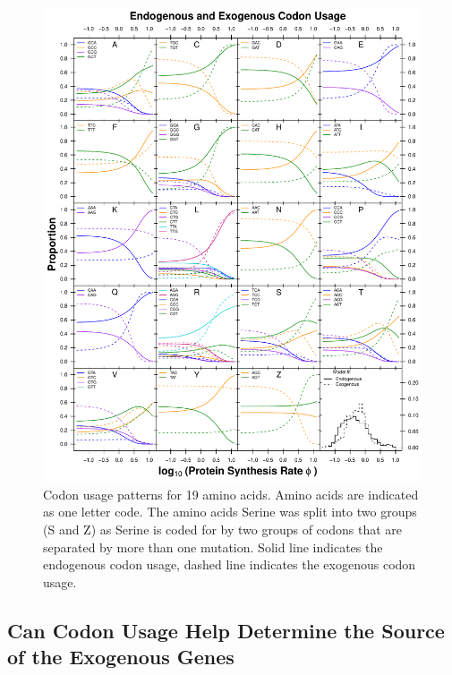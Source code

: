 \documentclass[doublespacing,linenumbers]{bmcart-modified}
\begin{document}
\begin{figure}
     \centering
	\includegraphics[width=\textwidth]{img/fig3.pdf}%
	\caption{Codon usage patterns for 19 amino acids. Amino acids are indicated as one letter code. 
	The amino acids Serine was split into two groups (S and Z) as Serine is coded for by two groups of codons that are separated by more than one mutation.
	Solid line indicates the endogenous codon usage, dashed line indicates the exogenous codon usage.}
	\label{fig:cub_endo_exo}
\end{figure}



\subsection*{Can Codon Usage Help Determine the Source of the Exogenous Genes}
\end{document}
